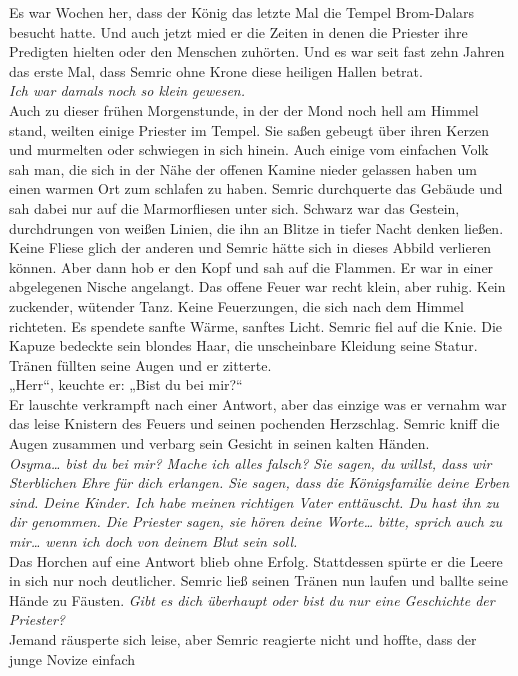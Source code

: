 Es war Wochen her, dass der König das letzte Mal die Tempel Brom-Dalars besucht hatte. Und auch 
jetzt mied er die Zeiten in denen die Priester ihre Predigten hielten oder den Menschen zuhörten. 
Und es war seit fast zehn Jahren das erste Mal, dass Semric ohne Krone diese heiligen Hallen 
betrat.\\
\textit{Ich war damals noch so klein gewesen.}\\
Auch zu dieser frühen Morgenstunde, in der der Mond noch hell am Himmel stand, weilten einige 
Priester im Tempel. Sie saßen gebeugt über ihren Kerzen und murmelten oder schwiegen in sich hinein. 
Auch einige vom einfachen Volk sah man, die sich in der Nähe der offenen Kamine nieder gelassen 
haben um einen warmen Ort zum schlafen zu haben. Semric durchquerte das Gebäude und sah dabei nur 
auf die Marmorfliesen unter sich. Schwarz war das Gestein, durchdrungen von weißen Linien, die ihn 
an Blitze in tiefer Nacht denken ließen. Keine Fliese glich der anderen und Semric hätte sich in 
dieses Abbild verlieren können. Aber dann hob er den Kopf und sah auf die Flammen. Er war in einer 
abgelegenen Nische angelangt. Das offene Feuer war recht klein, aber ruhig. Kein zuckender, wütender 
Tanz. Keine Feuerzungen, die sich nach dem Himmel richteten. Es spendete sanfte Wärme, sanftes 
Licht. Semric fiel auf die Knie. Die Kapuze bedeckte sein blondes Haar, die unscheinbare Kleidung 
seine Statur. Tränen füllten seine Augen und er zitterte.\\
„Herr“, keuchte er: „Bist du bei mir?“\\
Er lauschte verkrampft nach einer Antwort, aber das einzige was er vernahm war das leise Knistern 
des Feuers und seinen pochenden Herzschlag. Semric kniff die Augen zusammen und verbarg sein Gesicht 
in seinen kalten Händen.\\
\textit{Osyma… bist du bei mir? Mache ich alles falsch? Sie sagen, du willst, dass wir Sterblichen 
Ehre für dich erlangen. Sie sagen, dass die Königsfamilie deine Erben sind. Deine Kinder. Ich habe 
meinen richtigen Vater enttäuscht. Du hast ihn zu dir genommen. Die Priester sagen, sie hören deine 
Worte… bitte, sprich auch zu mir… wenn ich doch von deinem Blut sein soll.}\\
Das Horchen auf eine Antwort blieb ohne Erfolg. Stattdessen spürte er die Leere in sich nur noch 
deutlicher. Semric ließ seinen Tränen nun laufen und ballte seine Hände zu Fäusten. \textit{Gibt es 
dich überhaupt oder bist du nur eine Geschichte der Priester?}\\
Jemand räusperte sich leise, aber Semric reagierte nicht und hoffte, dass der junge Novize einfach 
